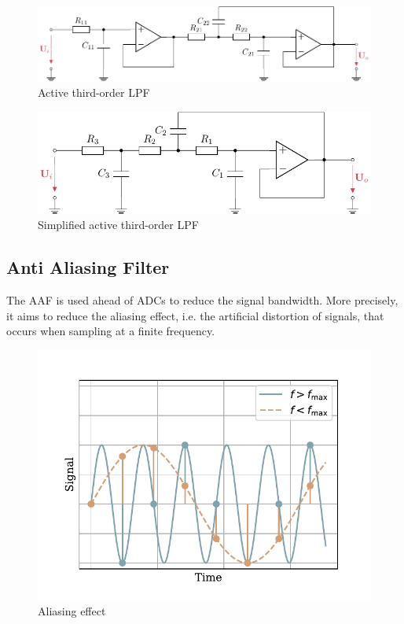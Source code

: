 \begin{figure}[!htb]
    \centering
    \includegraphics[scale=1]{figures/electronics/lowpass/lp_active_3ord_bessel/lp_active_3ord_bessel}
    \caption[Active third-order \ac{LPF}]{Active third-order \ac{LPF}}
    \label{fig:lp_active_3ord_bessel}
\end{figure}

\begin{figure}[!htb]
    \centering
    \includegraphics[scale=1]{figures/electronics/lowpass/lp_active_3ord_bessel_simple/lp_active_3ord_bessel_simple}
    \caption[Simplified active third-order \ac{LPF}]{Simplified active third-order \ac{LPF}}
    \label{fig:lp_active_3ord_bessel_simple}
\end{figure}

\subsection{Anti Aliasing Filter}
The \acf{AAF} is used ahead of \ac{ADC}s to reduce the signal bandwidth. More precisely, it aims to reduce the aliasing effect, i.e. the artificial distortion of signals, that occurs when sampling at a finite frequency.

\begin{figure}[!htb]
    \centering
    \includegraphics[scale=0.72]{figures/electronics/aaf/plot_aliasing}
    \caption[Aliasing]{Aliasing effect}
    \label{fig:plot_aliasing}
\end{figure}

